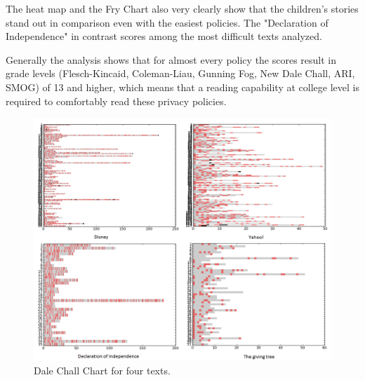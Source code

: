 \documentclass[runningheads,a4paper]{llncs}
\begin{document}
The heat map and the Fry Chart also very clearly show that the children's stories stand out in comparison even with the easiest policies. The "Declaration of Independence" in contrast scores among the most difficult texts analyzed.

Generally the analysis shows that for almost every policy the scores result in grade levels (Flesch-Kincaid, Coleman-Liau, Gunning Fog, New Dale Chall, ARI, SMOG) of 13 and higher, which means that a reading capability at college level is required to comfortably read these privacy policies.

\begin{figure}
\centering
\includegraphics[width=\textwidth]{Bilder/dalechall_comparison.png}
\caption{Dale Chall Chart for four texts.}
\label{fig:dalechalltop20}
\end{figure}
\end{document}
